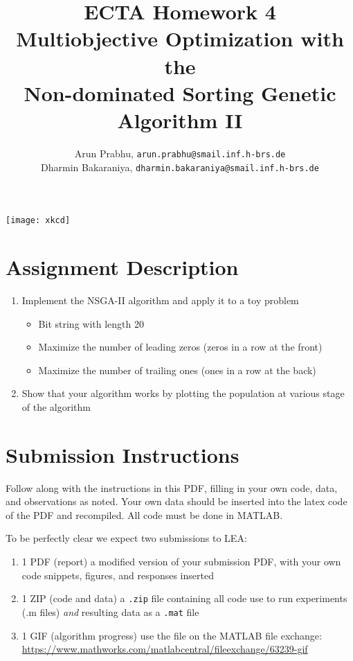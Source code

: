 \documentclass{article}
\title{ECTA Homework 4\\Multiobjective Optimization with the\\Non-dominated Sorting Genetic Algorithm II}
\author{\color{blue}Arun Prabhu, \texttt{arun.prabhu@smail.inf.h-brs.de}\\\color{blue}Dharmin Bakaraniya, \texttt{dharmin.bakaraniya@smail.inf.h-brs.de}}
\begin{document}
\maketitle

\begin{center}
	\begin{minipage}{1\linewidth}
		\begin{center}
			\texttt{[image: xkcd]}
		\end{center}
	\end{minipage}
\end{center}

\newpage

\section{Assignment Description}
	\begin{enumerate}
		\item Implement the NSGA-II algorithm and apply it to a toy problem
			\begin{itemize}
			\item Bit string with length 20
			\item Maximize the number of leading zeros (zeros in a row at the front)
			\item Maximize the number of trailing ones (ones in a row at the back)
		\end{itemize}
		\item Show that your algorithm works by plotting the population at various stage of the algorithm
	\end{enumerate}

\section{Submission Instructions}
Follow along with the instructions in this PDF, filling in your own code, data, and observations as noted. Your own data should be inserted into the latex code of the PDF and recompiled. All code must be done in MATLAB.\@

To be perfectly clear we expect two submissions to LEA:\@
\begin{enumerate}
	\item 1 PDF (report) \- a modified version of your submission PDF, with your own code snippets, figures, and responses inserted
    \item 1 ZIP (code and data)   \- a \texttt{.zip} file containing all code use to run experiments (.m files) \textit{and} resulting data as a \texttt{.mat} file
	\item 1 GIF (algorithm progress) \- use the file on the MATLAB file exchange: \url{https://www.mathworks.com/matlabcentral/fileexchange/63239-gif}
\end{enumerate}
\end{document}
